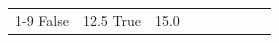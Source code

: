 \begin{table}[H]
\begin{tabular}{lllrlllll}
\cline{1-9}
False & 12.5%
\cline{1-9}
True & 15.0%

\end{tabular}
\end{table}
